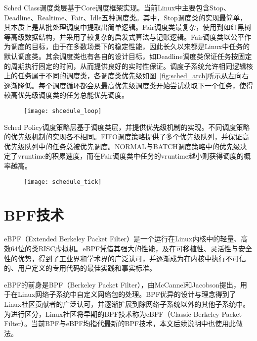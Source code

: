 Sched Class调度类层基于Core调度框架实现。当前Linux中主要包含Stop、Deadline、Realtime、Fair、Idle五种调度类\citep{scheduler}。其中，Stop调度类的实现最简单，其本质上是从批处理调度中提取出简单逻辑。Fair调度类最复杂，使用到如红黑树等高级数据结构，并采用了较复杂的启发式算法与记账逻辑。Fair调度类以公平作为调度的目标，由于在多数场景下的稳定性能，因此长久以来都是Linux中任务的默认调度类。其余调度类也有各自的设计目标，如Deadline调度类保证任务按固定的周期执行固定的时间，从而提供良好的实时性保证。调度子系统允许相同逻辑核上的任务属于不同的调度类，各调度类优先级如图~\ref{fig:sched_arch}所示从左向右逐渐降低。每个调度循环都会从最高优先级调度类开始尝试获取下一个任务，使得较高优先级调度类的任务总能优先调度。

\begin{figure}[!htbp]
    \centering 
    \texttt{[image: shcedule\_loop]}
    \label{fig:shcedule_loop}
\end{figure}

Sched Policy调度策略层基于调度类层，并提供优先级机制的实现。不同调度策略的优先级机制的实现各不相同。FIFO调度策略提供了多个优先级队列，并保证高优先级队列中的任务总被优先调度。NORMAL与BATCH调度策略中的优先级决定了vruntime的积累速度，而在Fair调度类中任务的vruntime越小则获得调度的概率越高。

\begin{figure}[!htbp]
    \centering
    \texttt{[image: schedule\_tick]}
    \label{fig:schedule_tick}
\end{figure}

\section{BPF技术}


eBPF（Extended Berkeley Packet Filter）是一个运行在Linux内核中的轻量、高效64位的类RISC虚拟机\citep{sharaf2022extended}。eBPF凭借其强大的性能，及在可移植性、灵活性与安全性的优势，得到了工业界和学术界的广泛认可，并逐渐成为在内核中执行不可信的、用户定义的专用代码的最佳实践和事实标准。

eBPF的前身是BPF（Berkeley Packet Filter），由McCannel和Jacobson提出\citep{mccanne1993bsd}，用于在Linux网络子系统中自定义网络包的处理。BPF优异的设计与理念得到了Linux社区贡献者的广泛认可，并逐渐扩展到除网络子系统以外的其他子系统中。为进行区分，Linux社区将早期的BPF技术称为cBPF（Classic Berkeley Packet Filter）。当前BPF与eBPF均指代最新的BPF技术，本文后续说明中也使用此做法。

